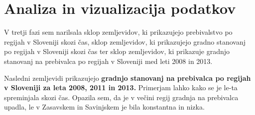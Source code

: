 \documentclass[11pt,a4paper]{article}
\begin{document}
\makebox[\textwidth][c]{

}

\newpage
\section{Analiza in vizualizacija podatkov}

V tretji fazi sem narilsala sklop zemljevidov, ki prikazujejo prebivalstvo po regijah v Sloveniji skozi čas, sklop zemljevidov, ki prikazujejo gradno stanovanj po regijah v Sloveniji skozi čas ter sklop zemljevidov, ki prikazuje gradnjo stanovanj na prebivalca po regijah v Sloveniji med leti 2008 in 2013.

\newpage
Nasledni zemljevidi prikazujejo \textbf{gradnjo stanovanj na prebivalca po regijah v Sloveniji za leta 2008, 2011 in 2013.} Primerjam lahko kako se je le-ta spreminjala skozi čas. Opazila sem, da je v večini regij gradnja na prebivalca upadla, le v Zasavskem in Savinjskem je bila konstantna in nizka.

\vspace{5mm}
\vspace{5mm}


\end{document}
